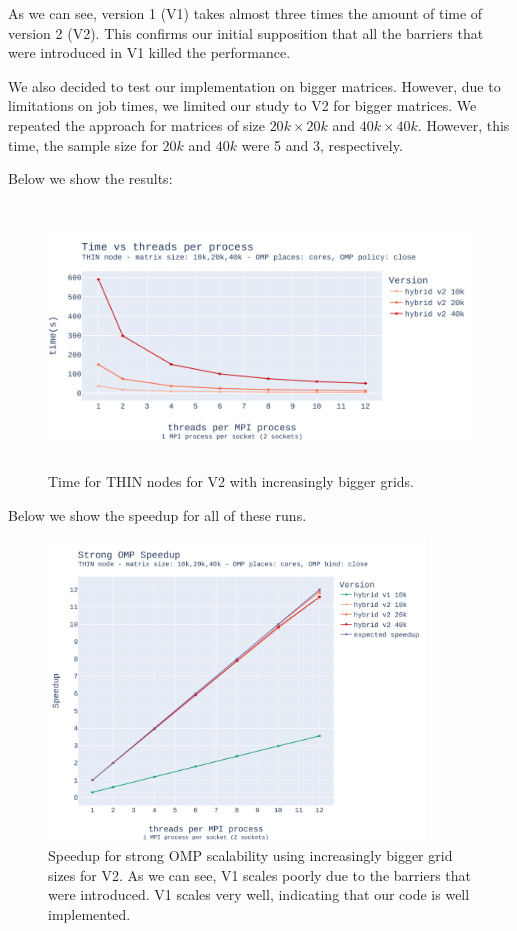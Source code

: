 \documentclass{report}
\begin{document}
As we can see, version 1 (V1) takes almost three times the amount of time of 
version 2 (V2). This confirms our initial supposition that all the barriers 
that were introduced in V1 killed the performance. 

We also decided to test our implementation on bigger matrices. However, due to 
limitations on job times, we limited our study to V2 for bigger matrices. 
We repeated the approach for matrices of size $20k\times 20k$ and $40k\times 40k$. 
However, this time, the sample size for $20k$ and $40k$ were 5 and 3, respectively.

Below we show the results: 

\begin{figure}[H]
\centering
\includegraphics[width=14cm, height=7cm]{./images/strong_OMP_thin_hybrid_v2.pdf}
\caption{\label{fig:strongompv2thin} Time for THIN nodes for V2 with increasingly
bigger grids.}
\end{figure}

Below we show the speedup for all of these runs.

\begin{figure}[H]
\centering
\includegraphics[width=10cm, height=8cm]{./images/strong_OMP_thin_hybrid_speedup.pdf}
\caption{\label{fig:strongompspeedupthin} Speedup for strong OMP scalability using 
increasingly bigger grid sizes for V2. As we can see, V1 scales poorly due to the 
barriers that were introduced. V1 scales very well, indicating that our code 
is well implemented.}
\end{figure}
\end{document}
